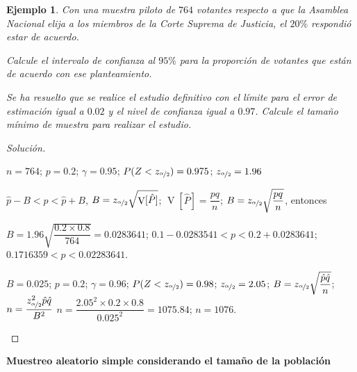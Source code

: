 \documentclass[a5paper,doc,10pt,noapacite]{apa6}
\DeclareMathOperator{\Var}{V}
\newtheorem{ejem}{Ejemplo}
\newcommand{\neodefi}[1]{%
	\vspace{1\baselineskip}
	\textbf{\small#1} \newline
}
\begin{document}
{{\begin{ejem}
	Con una muestra piloto de \(764\) votantes respecto a que la Asamblea Nacional elija a los miembros de la Corte Suprema de Justicia, el \(20\%\) respondió estar de acuerdo.
	\begin{APAenumerate}
		\item Calcule el intervalo de confianza al \(95\%\) para la proporción de votantes que están de acuerdo con ese planteamiento.
		\item Se ha resuelto que se realice el estudio definitivo con el límite para el error de estimación igual a \(0.02\) y el nivel de confianza igual a \(0.97\). Calcule el tamaño mínimo de muestra para realizar el estudio.
	\end{APAenumerate}
\end{ejem}
\begin{proof}[Solución]\quad
	\begin{APAenumerate}
		\item \(n=764\); \(p=0.2\); \(\gamma=0.95\); \(P(Z<z_{\nicefrac{\alpha}{2}})=0.975\); \(z_{\nicefrac{\alpha}{2}}=1.96\)
		
		\(\hat{p}-B<p<\hat{p}+B\), \(B=z_{\nicefrac{\alpha}{2}}\sqrt{\Var[\hat{P}]}\); \(\Var[\hat{P}]=\dfrac{pq}{n}\); \(B=z_{\nicefrac{\alpha}{2}}\sqrt{\dfrac{pq}{n}}\), entonces 
		
		\(B=1.96\sqrt{\dfrac{0.2 \times 0.8}{764}}=0.0283641\); \(0.1-0.0283541<p<0.2+0.0283641\); \(0.1716359<p<0.02283641\).
		
		\vspace{1\baselineskip}
		\item \(B=0.025\); \(p=0.2\); \(\gamma=0.96\); \(P(Z<z_{\nicefrac{\alpha}{2}})=0.98\); \(z_{\nicefrac{\alpha}{2}}=2.05\); \(B=z_{\nicefrac{\alpha}{2}}\sqrt{\dfrac{\hat{p}{\hat{q}}}{n}}\); \(n=\dfrac{z_{\nicefrac{\alpha}{2}}^2\hat{p}\hat{q}}{B^2}\)
		\(n=\dfrac{2.05^2 \times 0.2 \times 0.8}{0.025^2}=1075.84\); \(n=1076\).		\qedhere
	\end{APAenumerate}
\end{proof}

%
%
%
\newpage
\neodefi{Muestreo aleatorio simple considerando el tamaño de la población}


}}
\end{document}
